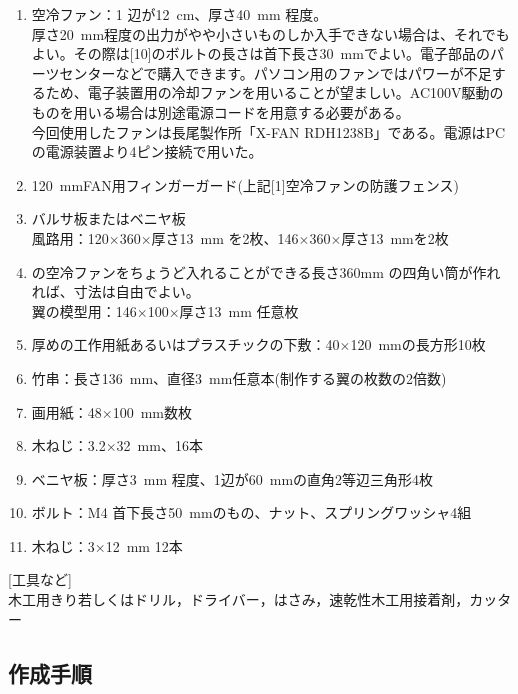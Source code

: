 \documentclass[11pt,b5paper,papersize,dvipdfmx]{jsbook}
\begin{document}
\renewcommand{\labelenumi}{[\arabic{enumi}]}
\begin{enumerate}
  \item 空冷ファン：1 辺が12\ cm、厚さ40\ mm 程度。\\
  厚さ20\ mm程度の出力がやや小さいものしか入手できない場合は、それでもよい。その際は[10]のボルトの長さは首下長さ30\ mmでよい。電子部品のパーツセンターなどで購入できます。パソコン用のファンではパワーが不足するため、電子装置用の冷却ファンを用いることが望ましい。AC100V駆動のものを用いる場合は別途電源コードを用意する必要がある。\\
  今回使用したファンは長尾製作所「X-FAN RDH1238B」である。電源はPCの電源装置より4ピン接続で用いた。
  \item 120\ mmFAN用フィンガーガード(上記[1]空冷ファンの防護フェンス)
  \item バルサ板またはベニヤ板\\
  風路用：120$\times$360$\times$厚さ13\ mm を2枚、146$\times$360$\times$厚さ13\ mmを2枚
  \item の空冷ファンをちょうど入れることができる長さ360mm の四角い筒が作れれば、寸法は自由でよい。\\
  翼の模型用：146$\times$100$\times$厚さ13\ mm 任意枚
  \item 厚めの工作用紙あるいはプラスチックの下敷：40$\times$120\ mmの長方形10枚
  \item 竹串：長さ136\ mm、直径3\ mm任意本(制作する翼の枚数の2倍数)
  \item 画用紙：48$\times$100\ mm数枚
  \item 木ねじ：3.2$\times$32\ mm、16本
  \item ベニヤ板：厚さ3\ mm 程度、1辺が60\ mmの直角2等辺三角形4枚
  \item ボルト：M4 首下長さ50\ mmのもの、ナット、スプリングワッシャ4組
  \item 木ねじ：3$\times$12\ mm 12本
\end{enumerate}
  [工具など]\\
  木工用きり若しくはドリル，ドライバー，はさみ，速乾性木工用接着剤，カッター
  \newpage
\subsection{作成手順}
\end{document}
